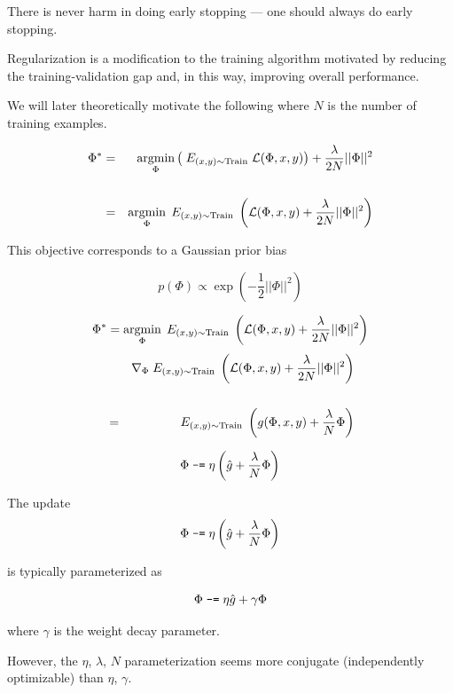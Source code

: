 {There is never harm in doing early stopping --- one should always do early stopping.

\vfill
Regularization is a modification to the training algorithm motivated by reducing the training-validation gap and, in this way, improving overall performance.


We will later theoretically motivate the following where $N$ is the number of training examples.

\vfill
{\color{red}
\begin{eqnarray*}
\Phi^* & = & \operatorname*{argmin}_\Phi \left(\;E_{(x,y) \sim \mathrm{Train}}\;{\cal L}(\Phi,x,y)\right) + \frac{\lambda}{2N}||\Phi||^2 \\
\\
& = & \operatorname*{argmin}_\Phi\;E_{(x,y) \sim \mathrm{Train}}\;\left({\cal L}(\Phi,x,y) + \frac{\lambda}{2N}||\Phi||^2\right)
\end{eqnarray*}
}

This objective corresponds to a Gaussian prior bias

{\color{red} $$p(\Phi) \propto \exp\left(-\frac{1}{2}||\Phi||^2\right)$$}


{\color{red} $$\Phi^* = \operatorname*{argmin}_\Phi \;E_{(x,y) \sim \mathrm{Train}}\;\left({\cal L}(\Phi,x,y) + \frac{\lambda}{2N}||\Phi||^2\right)$$}
\begin{eqnarray*}
  & & \nabla_\Phi \;E_{(x,y) \sim \mathrm{Train}}\;\left({\cal L}(\Phi,x,y) + \frac{\lambda}{2N}||\Phi||^2\right) \\
  \\
  & = & E_{(x,y) \sim \mathrm{Train}} \;\left(g(\Phi,x,y) + \frac{\lambda}{N} \Phi\right)
\end{eqnarray*}

\vfill
{\color{red} $$\Phi \;\mbox{\tt -=}\; \eta\left(\hat{g} +\frac{\lambda}{N}\Phi\right)$$}


The update
{\color{red} $$\Phi \;\mbox{\tt -=}\; \eta\left(\hat{g} +\frac{\lambda}{N}\Phi\right)$$}

\vfill
is typically parameterized as

{\color{red} $$\Phi \;\mbox{\tt -=} \; \eta \hat{g} + \gamma \Phi$$}

\vfill
where $\gamma$ is the weight decay parameter.

\vfill
However, the $\eta$, $\lambda$, $N$ parameterization seems more conjugate (independently optimizable) than $\eta$, $\gamma$.

}
